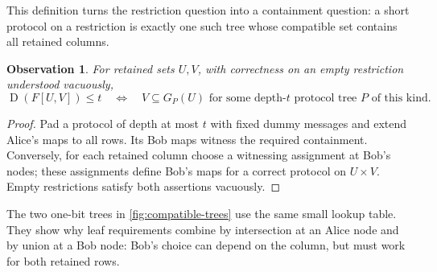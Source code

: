 \documentclass[11pt]{article} \usepackage[utf8]{inputenc}
\theoremstyle{plain} \newtheorem{theorem}{Theorem}[section]
\newtheorem{observation}[observation]{Observation}
\theoremstyle{definition} \newaliascnt{definition}{theorem}
\newcommand{\D}{\operatorname{D}}
\begin{document}
This definition turns the restriction question into a containment question: a
short protocol on a restriction is exactly one such tree whose compatible set
contains all retained columns.

\begin{observation}\label{obs:compatible-protocol}
For retained sets $U,V$, with correctness on an empty restriction understood
vacuously,
\begin{equation}\label{eq:compatibility}
 \D(F[U,V])\le t
 \quad\Longleftrightarrow\quad
 V\subseteq G_P(U)\text{ for some depth-}t\text{ protocol tree }P\text{ of this kind}.
\end{equation}
\end{observation}

\begin{proof}
Pad a protocol of depth at most $t$ with fixed dummy messages and extend Alice's
maps to all rows. Its Bob maps witness the required containment. Conversely,
for each retained column choose a witnessing assignment at Bob's nodes; these
assignments define Bob's maps for a correct protocol on $U\times V$. Empty
restrictions satisfy both assertions vacuously.
\end{proof}

The two one-bit trees in \cref{fig:compatible-trees} use the same small lookup
table. They show why leaf requirements combine by intersection at an Alice
node and by union at a Bob node: Bob's choice can depend on the column, but
must work for both retained rows.
\end{document}
